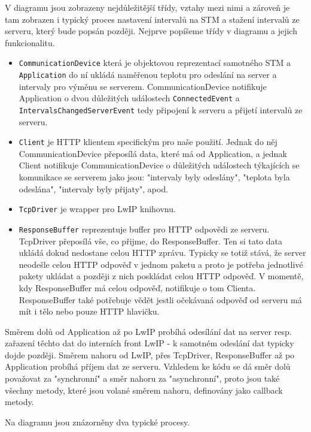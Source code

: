 V diagramu jsou zobrazeny nejdůležitější třídy, vztahy mezi nimi a zároveň je tam zobrazen i
typický proces nastavení intervalů na STM a stažení intervalů ze serveru, který bude popsán
později.
Nejprve popíšeme třídy v diagramu a jejich funkcionalitu.
\begin{itemize}
  \item \texttt{CommunicationDevice} která je objektovou reprezentací samotného STM a \texttt{Application}
    do ní ukládá naměřenou teplotu pro odeslání na server a intervaly pro výměnu se serverem.
    CommunicationDevice notifikuje Application o dvou důležitých událostech \texttt{ConnectedEvent} a
    \texttt{IntervalsChangedServerEvent} tedy připojení k serveru a přijetí intervalů ze serveru.
  \item \texttt{Client} je HTTP klientem specifickým pro naše použití. Jednak do něj CommunicationDevice
    přeposílá data, které má od Application, a jednak Client notifikuje CommunicationDevice o
    důležitých událostech týkajících se komunikace se serverem jako jsou: "intervaly byly odeslány",
    "teplota byla odeslána", "intervaly byly přijaty", apod.
  \item \texttt{TcpDriver} je wrapper pro LwIP knihovnu.
  \item \texttt{ResponseBuffer} reprezentuje buffer pro HTTP odpovědi ze serveru.
    TcpDriver přeposílá vše, co přijme, do ResponseBuffer.
    Ten si tato data ukládá dokud nedostane celou HTTP zprávu.
    Typicky se totiž stává, že server neodešle celou HTTP odpověď v jednom paketu a proto je potřeba
    jednotlivé pakety ukládat a později z nich poskládat celou HTTP odpověď.
    V momentě, kdy ResponseBuffer má celou odpověď, notifikuje o tom Clienta.
    ResponseBuffer také potřebuje vědět jestli očekávaná odpověď od serveru má mít i tělo nebo pouze
    HTTP hlavičku.
\end{itemize}

Směrem dolů od Application až po LwIP probíhá odesílání dat na server resp. zařazení těchto dat
do interních front LwIP - k samotném odeslání dat typicky dojde později.
Směrem nahoru od LwIP, přes TcpDriver, ResponseBuffer až po Application probíhá příjem dat
ze serveru.
Vzhledem ke kódu se dá směr dolů považovat za "synchronní" a směr nahoru za "asynchronní", proto
jsou také všechny metody, které jsou volané směrem nahoru, definovány jako callback metody.

Na diagramu jsou znázorněny dva typické procesy.

